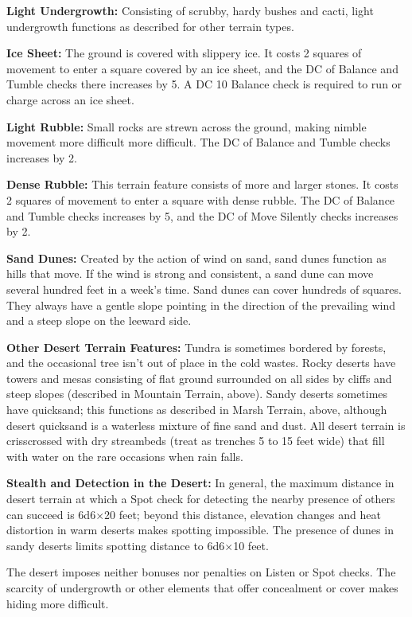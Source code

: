 \documentclass{article}
\begin{document}
\textbf{Light Undergrowth:} Consisting of scrubby, hardy bushes and cacti, light 
undergrowth functions as described for other terrain types.

\textbf{Ice Sheet: }The ground is covered with slippery ice. It costs 2 squares 
of movement to enter a square covered by an ice sheet, and the DC of Balance and 
Tumble checks there increases by 5. A DC 10 Balance check is required to run or 
charge across an ice sheet. 

\textbf{Light Rubble:} Small rocks are strewn across the ground, making nimble 
movement more difficult more difficult. The DC of Balance and Tumble checks increases 
by 2. 

\textbf{Dense Rubble:} This terrain feature consists of more and larger stones. 
It costs 2 squares of movement to enter a square with dense rubble. The DC of Balance 
and Tumble checks increases by 5, and the DC of Move Silently checks increases 
by 2.

\textbf{Sand Dunes:} Created by the action of wind on sand, sand dunes function 
as hills that move. If the wind is strong and consistent, a sand dune can move 
several hundred feet in a week's time. Sand dunes can cover hundreds of squares. 
They always have a gentle slope pointing in the direction of the prevailing wind 
and a steep slope on the leeward side.

\textbf{Other Desert Terrain Features:} Tundra is sometimes bordered by forests, 
and the occasional tree isn't out of place in the cold wastes. Rocky deserts have 
towers and mesas consisting of flat ground surrounded on all sides by cliffs and 
steep slopes (described in Mountain Terrain, above). Sandy deserts sometimes have 
quicksand; this functions as described in Marsh Terrain, above, although desert 
quicksand is a waterless mixture of fine sand and dust. All desert terrain is crisscrossed 
with dry streambeds (treat as trenches 5 to 15 feet wide) that fill with water 
on the rare occasions when rain falls.

\textbf{Stealth and Detection in the Desert:} In general, the maximum distance 
in desert terrain at which a Spot check for detecting the nearby presence of others 
can succeed is 6d6\ensuremath{\times}20 feet; beyond this distance, elevation changes 
and heat distortion in warm deserts makes spotting impossible. The presence of 
dunes in sandy deserts limits spotting distance to 6d6\ensuremath{\times}10 feet. 

The desert imposes neither bonuses nor penalties on Listen or Spot checks. The 
scarcity of undergrowth or other elements that offer concealment or cover makes 
hiding more difficult.
\end{document}
